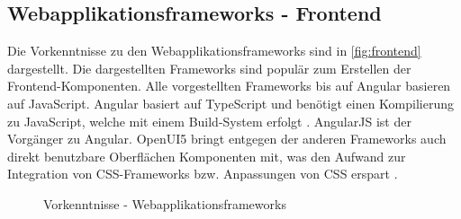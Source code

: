 \subsection{Webapplikationsframeworks - Frontend}
Die Vorkenntnisse zu den Webapplikationsframeworks sind in \autoref{fig:frontend} dargestellt. Die dargestellten Frameworks sind populär zum Erstellen der Frontend-Komponenten.
Alle vorgestellten Frameworks bis auf Angular basieren auf JavaScript.
Angular basiert auf TypeScript und benötigt einen Kompilierung zu JavaScript, welche mit einem Build-System erfolgt \autocite[vgl.][]{Google.od}.
AngularJS ist der Vorgänger zu Angular.
OpenUI5 bringt entgegen der anderen Frameworks auch direkt benutzbare Oberflächen Komponenten mit, was den Aufwand zur Integration von \ac{CSS}-Frameworks bzw. Anpassungen von \ac{CSS} erspart \autocite[vgl.][]{SAP.od}.

\begin{figure}[H]
	\caption{Vorkenntnisse - Webapplikationsframeworks}
	\label{fig:frontend}
\end{figure}